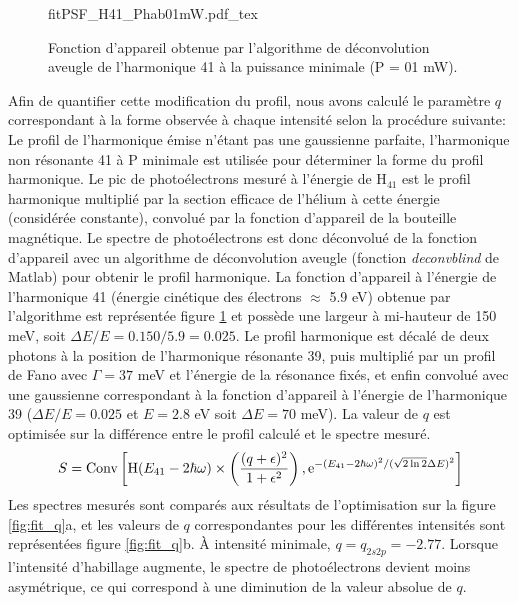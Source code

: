 \begin{figure}[ht]
\centering
\def\svgwidth{0.5\textwidth}
{fitPSF_H41_Phab01mW.pdf_tex}
\caption{Fonction d'appareil obtenue par l'algorithme de déconvolution aveugle de l'harmonique 41 à la puissance minimale (P = 01 mW).}
\label{fig:fitPSF_H41}
\end{figure}

Afin de quantifier cette modification du profil, nous avons calculé le paramètre $q$ correspondant à la forme observée à chaque intensité selon la procédure suivante: Le profil de l'harmonique émise n'étant pas une gaussienne parfaite, l'harmonique non résonante 41 à P minimale est utilisée pour déterminer la forme du profil harmonique. Le pic de photoélectrons mesuré à l'énergie de H$_{41}$ est le profil harmonique multiplié par la section efficace de l'hélium à cette énergie (considérée constante), convolué par la fonction d'appareil de la bouteille magnétique. Le spectre de photoélectrons est donc déconvolué de la fonction d'appareil avec un algorithme de déconvolution aveugle (fonction \textit{deconvblind} de Matlab) pour obtenir le profil harmonique. La fonction d'appareil à l'énergie de l'harmonique 41 (énergie cinétique des électrons $\approx$ 5.9 eV) obtenue par l'algorithme est représentée figure \ref{fig:fitPSF_H41}
et possède une largeur à mi-hauteur de 150 meV, soit $\Delta E / E = 0.150 / 5.9 = 0.025$.
Le profil harmonique est décalé de deux photons à la position de l'harmonique résonante 39, puis multiplié par un profil de Fano avec $\Gamma = 37$ meV et l'énergie de la résonance fixés, et enfin convolué avec une gaussienne correspondant à la fonction d'appareil à l'énergie de l'harmonique 39 ($\Delta E / E = 0.025$ et $E = 2.8$ eV soit $\Delta E = 70$ meV). La valeur de $q$ est optimisée sur la différence entre le profil calculé et le spectre mesuré.
\begin{equation}
S = \text{Conv} \left[ \text{H}(E_{41} - 2\hbar \omega) \times \left( \frac{(q+\epsilon)^2}{1+\epsilon^2}\right), \mathrm{e}^{-(E_{41} - 2\hbar \omega)^2/(\sqrt{2 \ln 2} \Delta E)^2} \right]
\end{equation}
Les spectres mesurés sont comparés aux résultats de l'optimisation sur la figure \ref{fig:fit_q}a, et les valeurs de $q$ correspondantes pour les différentes intensités sont représentées figure \ref{fig:fit_q}b. \`{A} intensité minimale, $q = q_{2s2p} = -2.77$. Lorsque l'intensité d'habillage augmente, le spectre de photoélectrons devient moins asymétrique, ce qui correspond à une diminution de la valeur absolue de $q$. 

